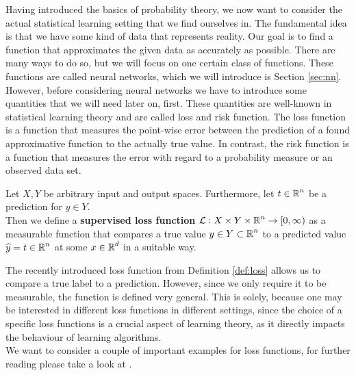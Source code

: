 Having introduced the basics of probability theory, we now want to consider the actual statistical learning setting that we find ourselves in. The fundamental idea is that we have some kind of data that represents reality. Our goal is to find a function that approximates the given data as accurately as possible. There are many ways to do so, but we will focus on one certain class of functions. These functions are called neural networks, which we will introduce is Section \ref{sec:nn}. However, before considering neural networks we have to introduce some quantities that we will need later on, first. These quantities are well-known in statistical learning theory and are called loss and risk function. The loss function is a function that measures the point-wise error between the prediction of a found approximative function to the actually true value. In contrast, the risk function is a function that measures the error with regard to a probability measure or an observed data set.


\begin{definition}\label{def:loss}
Let $X,Y$ be arbitrary input and output spaces. Furthermore, let $t\in\operatorname{\mathbb{R}}^n$ be a prediction for $y\in Y$.\\
Then we define a \textbf{supervised loss function} $\operatorname{\mathcal{L}}: X \times Y \times \operatorname{\mathbb{R}}^n \to [0, \infty)$ as a measurable function that compares a true value $y \in Y \subset \operatorname{\mathbb{R}}^n$ to a predicted value $\widehat{y} = t \in\operatorname{\mathbb{R}}^{n}$ at some $x\in\operatorname{\mathbb{R}}^{d}$ in a suitable way.
\end{definition}

The recently introduced loss function from Definition \ref{def:loss} allows us to compare a true label to a prediction. However, since we only require it to be measurable, the function is defined very general. This is solely, because one may be interested in different loss functions in different settings, since the choice of a specific loss functions is a crucial aspect of learning theory, as it directly impacts the behaviour of learning algorithms.\\
We want to consider a couple of important examples for loss functions, for further reading please take a look at \cite[Chapter~4.3]{goodfellow2016deep}.


